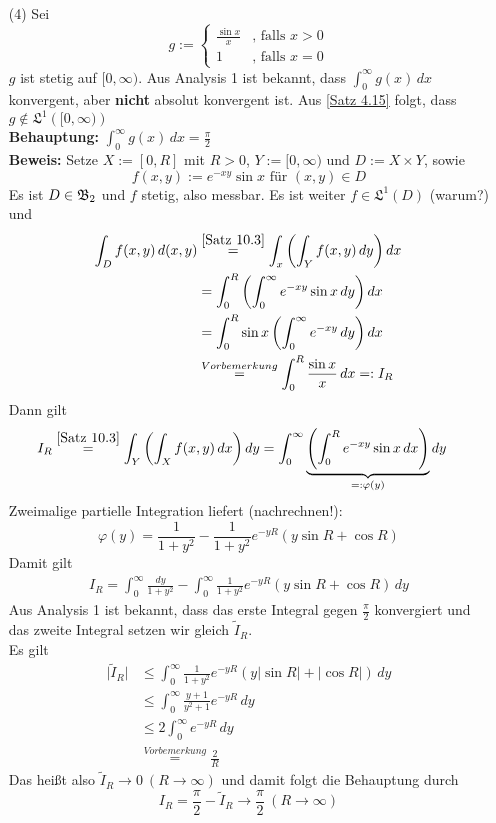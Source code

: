 \documentclass[a4paper,twoside,DIV15,BCOR12mm,chapterprefix=true,headings=onelinechapter]{scrbook}
\begin{document}
\begin{beispiel}
\begin{enumerate}
\item[(4)]
	Sei
	\[g:=
	\begin{cases}
		\frac{\sin x}{x}	&\text{, falls } x>0	\\
		1			&\text{, falls } x=0
	\end{cases}\]
	$g$ ist stetig auf \([0,\infty)\). Aus Analysis 1 ist bekannt, dass
	\(\int_0^\infty g(x)\,dx\) konvergent, aber \textbf{ nicht } 
	absolut konvergent ist. Aus \ref{Satz 4.15} folgt, dass 
	\(g\notin\mathfrak{L}^1\left([0,\infty)\right)\)\\
	\textbf{Behauptung: } \(\int^\infty_0 g(x)\,dx = \frac\pi{2}\)\\
	\textbf{Beweis: } Setze \(X:=[0,R]\) mit \(R>0\), \(Y:=[0,\infty)\) und
	\(D:=X\times Y\), sowie 
	\[f(x,y):= e^{-xy}\sin x \text{ für } (x,y)\in D\]
	Es ist \(D\in\mathfrak{B}_2\) und $f$ stetig, also messbar. Es ist weiter
	\(f\in\mathfrak{L}^1(D)\) (warum?) und
	\begin{align*}
		\int_D f(x,y)\,d(x,y)
		&\overset{\ref{Satz 10.3}}=
		\int_x\left(\int_Y f(x,y)\,dy\right)dx			\\
		&=\int_0^R\left(\int_0^\infty e^{-xy}\sin x\,dy\right)dx\\
		&=\int^R_0\sin x\left(\int_0^\infty e^{-xy}\,dy\right)dx\\
		&\overset{Vorbemerkung}=
		\int^R_0\frac{\sin x}{x}\,dx =:I_R
	\end{align*}
	Dann gilt
	\begin{align*}
		I_R
		&\overset{\ref{Satz 10.3}}=
		\int_Y\left(\int_X f(x,y)\,dx\right)dy
		=\int^\infty_0\underbrace{
		\left(\int^R_0 e^{-xy}\sin x\,dx\right)}_{=:\varphi(y)}dy
	\end{align*}
	Zweimalige partielle Integration liefert (nachrechnen!):
	\[\varphi(y)=\frac1{1+y^2}-\frac1{1+y^2}e^{-yR}(y\sin R+\cos R)\]
	Damit gilt
	\begin{align*}
		I_R=
		\int^\infty_0 \frac{dy}{1+y^2}
		-\int^\infty_0\frac1{1+y^2}e^{-yR}(y\sin R+\cos R)\,dy
	\end{align*}
	Aus Analysis 1 ist bekannt, dass das erste Integral gegen
	\(\frac{\pi}2\) konvergiert und das zweite Integral setzen
	wir gleich \(\tilde I_R\).\\
	Es gilt
	\begin{align*}
		\lvert\tilde I_R\rvert
		&\leq \int^\infty_0\frac1{1+y^2}e^{-yR}
		(y\lvert\sin R\rvert + \lvert\cos R\rvert)\,dy	\\
		&\leq \int^\infty_0\frac{y+1}{y^2+1} e^{-yR}\,dy\\
		&\leq 2\int^\infty_0 e^{-yR}\,dy		\\
		&\overset{Vorbemerkung}=\frac2R
	\end{align*}
	Das heißt also \(\tilde I_R\to 0 \ (R\to\infty)\) und damit folgt 
	die Behauptung durch
	\[I_R=\frac{\pi}2-\tilde I_R\to\frac{\pi}2 \ (R\to\infty)\]	
\end{enumerate}
\end{beispiel}
\end{document}
